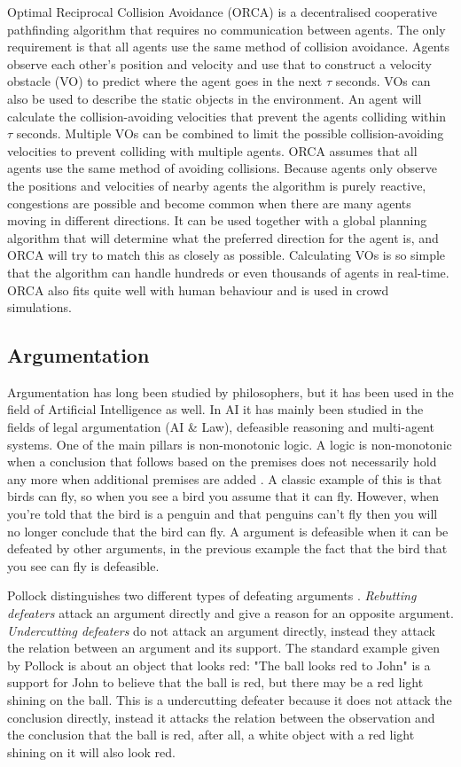 Optimal Reciprocal Collision Avoidance (ORCA) \cite{vandenberg2011} is a
decentralised cooperative pathfinding algorithm that requires no communication
between agents. The only requirement is that all agents use the same method of
collision avoidance. Agents observe each other's position and velocity and use
that to construct a velocity obstacle (VO) to predict where the agent goes in
the next $\tau$ seconds. VOs can also be used to describe the static objects in
the environment. An agent will calculate the collision-avoiding velocities that
prevent the agents colliding within $\tau$ seconds. Multiple VOs can be
combined to limit the possible collision-avoiding velocities to prevent
colliding with multiple agents. ORCA assumes that all agents use the same
method of avoiding collisions. Because agents only observe the positions and
velocities of nearby agents the algorithm is purely reactive, congestions are
possible and become common when there are many agents moving in different
directions. It can be used together with a global planning algorithm that will
determine what the preferred direction for the agent is, and ORCA will try to
match this as closely as possible. Calculating VOs is so simple that the
algorithm can handle hundreds or even thousands of agents in real-time. ORCA
also fits quite well with human behaviour and is used in crowd simulations.

\subsection{Argumentation}
Argumentation has long been studied by philosophers, but it has been used in
the field of Artificial Intelligence as well. In AI it has mainly been studied
in the fields of legal argumentation (AI \& Law), defeasible reasoning and
multi-agent systems. One of the main pillars is non-monotonic logic. A logic is
non-monotonic when a conclusion that follows based on the premises does not
necessarily hold any more when additional premises are added
\cite{vaneemeren2014}. A classic example of this is that birds can fly, so when
you see a bird you assume that it can fly. However, when you're told that the
bird is a penguin and that penguins can't fly then you will no longer conclude
that the bird can fly. A argument is defeasible when it can be defeated by
other arguments, in the previous example the fact that the bird that you see
can fly is defeasible.

Pollock distinguishes two different types of defeating arguments
\cite{pollock1995}. \emph{Rebutting defeaters} attack an argument directly and
give a reason for an opposite argument. \emph{Undercutting defeaters} do not
attack an argument directly, instead they attack the relation between an
argument and its support. The standard example given by Pollock is about an
object that looks red: "The ball looks red to John" is a support for John to
believe that the ball is red, but there may be a red light shining on the ball.
This is a undercutting defeater because it does not attack the conclusion
directly, instead it attacks the relation between the observation and the
conclusion that the ball is red, after all, a white object with a red light
shining on it will also look red.

